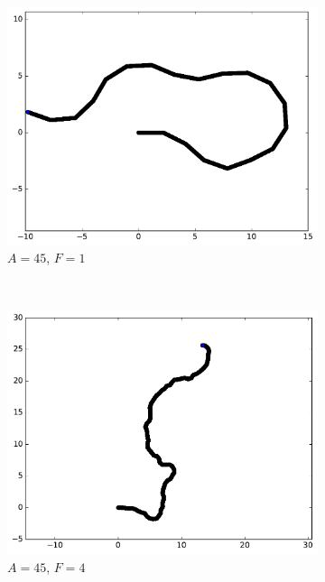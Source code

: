 	\begin{figure}[htb]
		\begin{subfigure}[t]{\subImgWmo}
			\centering
			\includegraphics[width=\textwidth]{figures/ch3/synTraj_219_45_1}
			\caption[$A = 45$, $F=1$]{$A = 45$, $F=1$}
			\label{fig:synTraj_219_45_1}
		\end{subfigure}
		~
		\begin{subfigure}[t]{\subImgWmo}
			\centering
			\includegraphics[width=\textwidth]{figures/ch3/synTraj_219_45_4}
			\caption[$A = 45$, $F=4$]{$A = 45$, $F=4$}
			\label{fig:synTraj_219_45_4}
		\end{subfigure}
		~
		\begin{subfigure}[t]{\subImgWmo}

\end{subfigure}
\end{figure}
